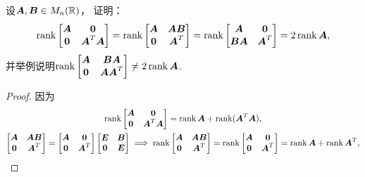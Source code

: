 \begin{example}
设\(\boldsymbol{A},\boldsymbol{B} \in M_n(\mathbb{R})\)，
证明：\begin{equation*}
	\rank\begin{bmatrix}
		\boldsymbol{A} & \boldsymbol0 \\
		\boldsymbol0 & \boldsymbol{A}^T \boldsymbol{A}
	\end{bmatrix}
	= \rank\begin{bmatrix}
		\boldsymbol{A} & \boldsymbol{A} \boldsymbol{B} \\
		\boldsymbol0 & \boldsymbol{A}^T
	\end{bmatrix}
	= \rank\begin{bmatrix}
		\boldsymbol{A} & \boldsymbol0 \\
		\boldsymbol{B} \boldsymbol{A} & \boldsymbol{A}^T
	\end{bmatrix}
	= 2 \rank\boldsymbol{A},
\end{equation*}
并举例说明\(\rank\begin{bmatrix}
	\boldsymbol{A} & \boldsymbol{B} \boldsymbol{A} \\
	\boldsymbol0 & \boldsymbol{A} \boldsymbol{A}^T
\end{bmatrix}
\neq 2 \rank\boldsymbol{A}\).
\begin{proof}
因为\begin{gather*}
	\rank\begin{bmatrix}
		\vb{A} & \vb0 \\
		\vb0 & \vb{A}^T \vb{A}
	\end{bmatrix}
	= \rank\vb{A} + \rank(\vb{A}^T \vb{A}), \\
	\begin{bmatrix}
		\vb{A} & \vb{A} \vb{B} \\
		\vb0 & \vb{A}^T
	\end{bmatrix}
	= \begin{bmatrix}
		\vb{A} & \vb0 \\
		\vb0 & \vb{A}^T
	\end{bmatrix}
	\begin{bmatrix}
		\vb{E} & \vb{B} \\
		\vb0 & \vb{E}
	\end{bmatrix}
	\implies
	\rank\begin{bmatrix}
		\vb{A} & \vb{A} \vb{B} \\
		\vb0 & \vb{A}^T
	\end{bmatrix}
	= \rank\begin{bmatrix}
		\vb{A} & \vb0 \\
		\vb0 & \vb{A}^T
	\end{bmatrix}
	= \rank\vb{A} + \rank\vb{A}^T, \\

\end{gather*}
\end{proof}
\end{example}
